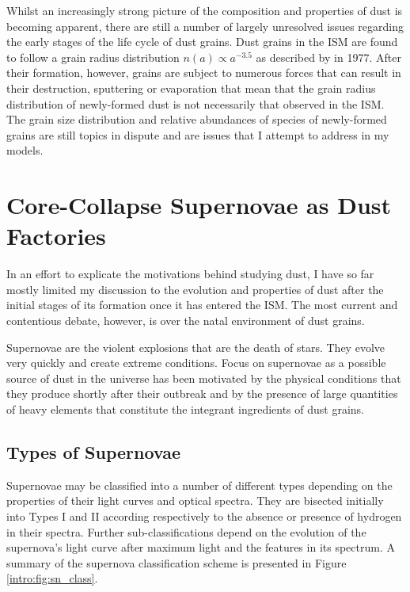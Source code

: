 Whilst an increasingly strong picture of the composition and properties of dust is becoming apparent, there are still a number of largely unresolved issues regarding the early stages of the life cycle of dust grains.  Dust grains in the ISM are found to follow a grain radius distribution $n(a) \propto a^{-3.5}$ as described by \citeauthor{Mathis1977} in 1977.  After their formation, however, grains are subject to numerous forces that can result in their destruction, sputtering or evaporation that mean that the grain radius distribution of newly-formed dust is not necessarily that observed in the ISM.  The grain size distribution and relative abundances of species of newly-formed grains are still topics in dispute and are issues that I attempt to address in my models.

\section{Core-Collapse Supernovae as Dust Factories}

In an effort to explicate the motivations behind studying dust, I have so far mostly limited my discussion to the evolution and properties of dust after the initial stages of its formation once it has entered the ISM.  The most current and contentious debate, however, is over the natal environment of dust grains.  

Supernovae are the violent explosions that are the death of stars.  They evolve very quickly and create extreme conditions.  Focus on supernovae as a possible source of dust in the universe has been motivated by the physical conditions that they produce shortly after their outbreak and by the presence of large quantities of heavy elements that constitute the integrant ingredients of dust grains.


\subsection{Types of Supernovae}

Supernovae may be classified into a number of different types depending on the properties of their light curves and optical spectra.  They are bisected initially into Types I and II according respectively to the absence or presence of hydrogen in their spectra.  Further sub-classifications depend on the evolution of the supernova's light curve after maximum light and the features in its spectrum.  A summary of the supernova classification scheme is presented in Figure \ref{intro:fig:sn_class}.  

